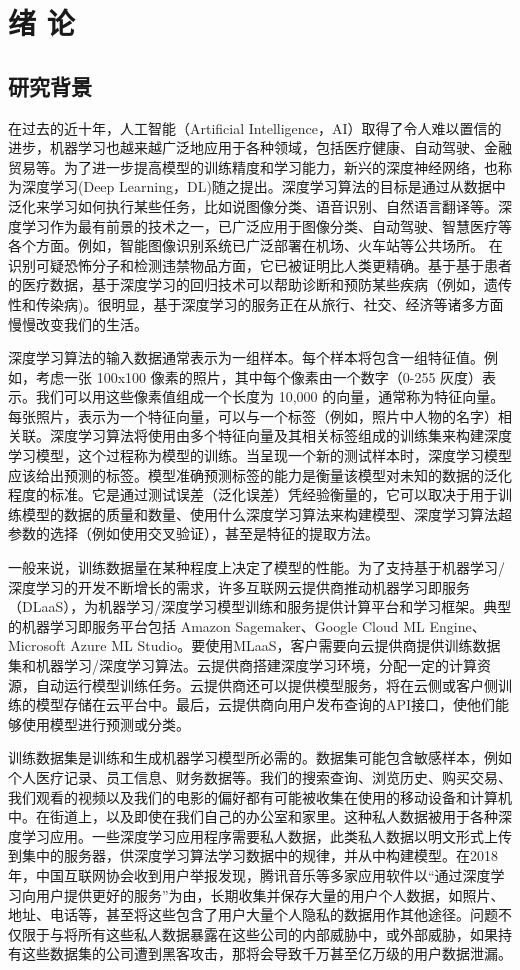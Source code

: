 \chapter{绪\hskip 0.4cm 论}
\label{ch1}

\section{研究背景}
在过去的近十年，人工智能（Artificial Intelligence，AI）取得了令人难以置信的进步，机器学习也越来越广泛地应用于各种领域，包括医疗健康、自动驾驶、金融贸易等。为了进一步提高模型的训练精度和学习能力，新兴的深度神经网络，也称为深度学习(Deep Learning，DL)随之提出。深度学习算法的目标是通过从数据中泛化来学习如何执行某些任务，比如说图像分类、语音识别、自然语言翻译等。深度学习作为最有前景的技术之一，已广泛应用于图像分类、自动驾驶、智慧医疗等各个方面。例如，智能图像识别系统已广泛部署在机场、火车站等公共场所。 在识别可疑恐怖分子和检测违禁物品方面，它已被证明比人类更精确。基于基于患者的医疗数据，基于深度学习的回归技术可以帮助诊断和预防某些疾病（例如，遗传性和传染病)。很明显，基于深度学习的服务正在从旅行、社交、经济等诸多方面慢慢改变我们的生活。

深度学习算法的输入数据通常表示为一组样本。每个样本将包含一组特征值。例如，考虑一张 100x100 像素的照片，其中每个像素由一个数字（0-255 灰度）表示。我们可以用这些像素值组成一个长度为 10,000 的向量，通常称为特征向量。每张照片，表示为一个特征向量，可以与一个标签（例如，照片中人物的名字）相关联。深度学习算法将使用由多个特征向量及其相关标签组成的训练集来构建深度学习模型，这个过程称为模型的训练。当呈现一个新的测试样本时，深度学习模型应该给出预测的标签。模型准确预测标签的能力是衡量该模型对未知的数据的泛化程度的标准。它是通过测试误差（泛化误差）凭经验衡量的，它可以取决于用于训练模型的数据的质量和数量、使用什么深度学习算法来构建模型、深度学习算法超参数的选择（例如使用交叉验证），甚至是特征的提取方法。

一般来说，训练数据量在某种程度上决定了模型的性能。为了支持基于机器学习/深度学习的开发不断增长的需求，许多互联网云提供商推动机器学习即服务（DLaaS），为机器学习/深度学习模型训练和服务提供计算平台和学习框架。典型的机器学习即服务平台包括 Amazon Sagemaker、Google Cloud ML Engine、Microsoft Azure ML Studio。要使用MLaaS，客户需要向云提供商提供训练数据集和机器学习/深度学习算法。云提供商搭建深度学习环境，分配一定的计算资源，自动运行模型训练任务。云提供商还可以提供模型服务，将在云侧或客户侧训练的模型存储在云平台中。最后，云提供商向用户发布查询的API接口，使他们能够使用模型进行预测或分类。

训练数据集是训练和生成机器学习模型所必需的。数据集可能包含敏感样本，例如个人医疗记录、员工信息、财务数据等。我们的搜索查询、浏览历史、购买交易、我们观看的视频以及我们的电影的偏好都有可能被收集在使用的移动设备和计算机中。在街道上，以及即使在我们自己的办公室和家里。这种私人数据被用于各种深度学习应用。一些深度学习应用程序需要私人数据，此类私人数据以明文形式上传到集中的服务器，供深度学习算法学习数据中的规律，并从中构建模型。在2018年，中国互联网协会收到用户举报发现，腾讯音乐等多家应用软件以“通过深度学习向用户提供更好的服务”为由，长期收集并保存大量的用户个人数据，如照片、地址、电话等，甚至将这些包含了用户大量个人隐私的数据用作其他途径。问题不仅限于与将所有这些私人数据暴露在这些公司的内部威胁中，或外部威胁，如果持有这些数据集的公司遭到黑客攻击，那将会导致千万甚至亿万级的用户数据泄漏。

